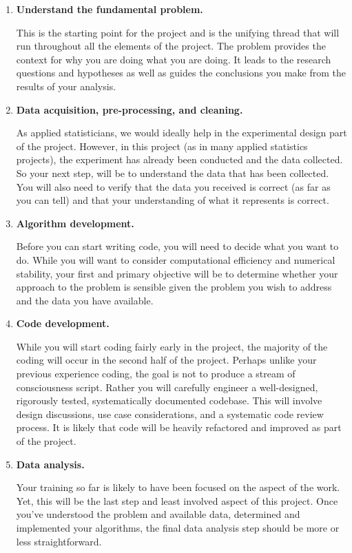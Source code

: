 \documentclass[11pt, oneside]{article}   	%
\begin{document}
\begin{enumerate}

\item \textbf{Understand the fundamental problem.}

This is the starting point for the project and is the unifying thread that will
run throughout all the elements of the project.  The problem provides the
context for why you are doing what you are doing.  It leads to the research questions
and hypotheses as well as guides the conclusions you make from the results of
your analysis.

\item \textbf{Data acquisition, pre-processing, and cleaning.}

As applied statisticians, we would ideally help in the experimental design part
of the project.  However, in this project (as in many applied statistics
projects), the experiment has already been conducted and the data collected.
So your next step, will be to understand the data that has been collected.  You
will also need to verify that the data you received is correct (as far as you
can tell) and that your understanding of what it represents is correct.

\item \textbf{Algorithm development.}

Before you can start writing code, you will need to decide what you want to do.
While you will want to consider computational efficiency and numerical
stability, your first and primary objective will be to determine whether your
approach to the problem is sensible given the problem you wish to address and
the data you have available.

\item \textbf{Code development.}

While you will start coding fairly early in the project, the majority of the
coding will occur in the second half of the project.  Perhaps unlike your
previous experience coding, the goal is not to produce a stream of
consciousness script.  Rather you will carefully engineer a well-designed,
rigorously tested, systematically documented codebase.  This will involve
design discussions, use case considerations, and a systematic code review
process.  It is likely that code will be heavily refactored and improved as
part of the project.

\item \textbf{Data analysis.}

Your training so far is likely to have been focused on the aspect of the
work.  Yet, this will be the last step and least involved aspect of this
project.  Once you've understood the problem and available data, determined and
implemented your algorithms, the final data analysis step should be more or
less straightforward.

\end{enumerate}
\end{document}

